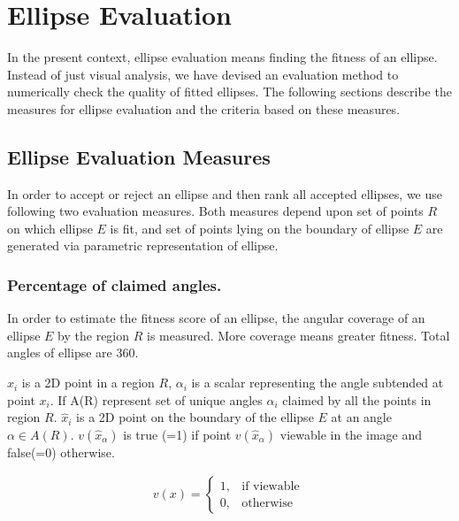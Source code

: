 \documentclass[preprint]{iucr}              %
\begin{document}
\section{Ellipse Evaluation} \label{sec:ellipseEval}
In the present context, ellipse evaluation means finding the fitness of an
ellipse. 
Instead of just visual analysis, we have devised an evaluation method to
numerically check the quality of fitted ellipses. 
The following sections describe the measures for ellipse evaluation and the
criteria based on these measures. 

\subsection{Ellipse Evaluation Measures} \label{sec:evalMeasures}
In order to accept or reject an ellipse and then rank all accepted ellipses, we
use following two evaluation measures. 
Both measures depend upon set of points $R$ on which ellipse $E$ is fit, and set
of points lying on the boundary of ellipse $E$ are generated via parametric
representation of ellipse.  

\subsubsection{Percentage of claimed angles.}
In order to estimate the fitness score of an ellipse, the angular coverage of an
ellipse $E$ by the region $R$ is measured. 
More coverage means greater fitness.
Total angles of ellipse are 360.

$x_i$ is a 2D point in a region $R$, $\alpha_i$ is a scalar representing the
angle subtended at point $x_i$. 
If A(R) represent set of unique angles $\alpha_i$ claimed by all the points in
region $R$. 
$\hat{x}_i$ is a 2D point on the boundary of the ellipse $E$ at an angle $\alpha
\in A(R)$. 
$v(\hat{x}_\alpha)$ is true (=1) if point $v(\hat{x}_\alpha)$ viewable in the
image and false(=0) otherwise. 

\begin{align}
v(x) = 
\begin{cases}
      1, & \text{if viewable}\  \\
      0, & \text{otherwise}
\end{cases}      
\end{align}
\end{document}
